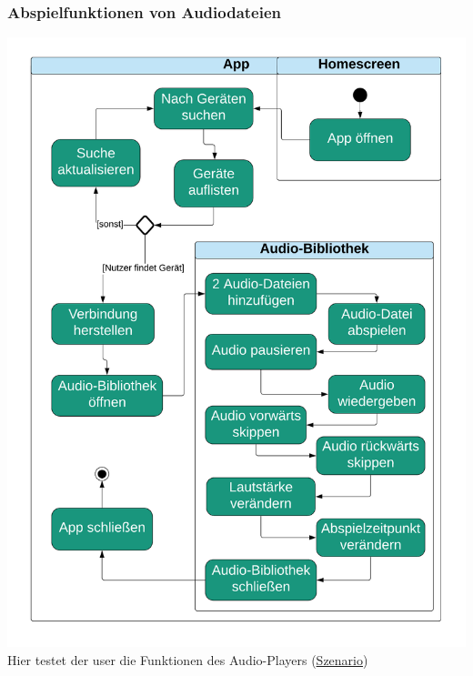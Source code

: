 \documentclass[../pflichtenheft.tex]{subfiles}
\begin{document}
		\subsubsection{Abspielfunktionen von Audiodateien}
		\label{sec:abspielen}
			\includegraphics[page=1,width=400pt,keepaspectratio]{../graphics/UML/Abspielfunktionen_von_Audio-Dateien.png}
			Hier testet der \Gls{user} die Funktionen des Audio-Players (\hyperref[sec:abspielenS]{Szenario})
\end{document}

